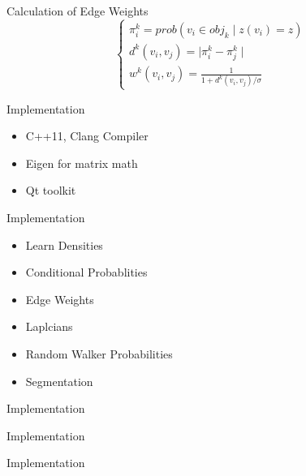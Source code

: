 \documentclass[14pt]{beamer}
\begin{document}
\begin{frame}{Calculation of Edge Weights}
    \[
        \begin{cases}
        \pi_i^k = prob(v_i \in obj_k \mid z(v_i)=z) \\
        d^k(v_{i}, v_{j}) = \mid \pi_i^k - \pi_j^k \mid \\
        w^{k}(v_{i}, v_{j}) = \frac{1}{1+d^{k}(v_{i}, v_{j})/\sigma}
    \end{cases}
    \]
\end{frame}

\begin{frame}{Implementation}
    \begin{itemize}
        \item C++11, Clang Compiler
        \item Eigen for matrix math
        \item Qt toolkit
    \end{itemize}
\end{frame}
\begin{frame}{Implementation}
    \begin{itemize}
        \item Learn Densities
        \item Conditional Probablities
        \item Edge Weights
        \item Laplcians
        \item Random Walker Probabilities
        \item Segmentation
    \end{itemize}
\end{frame}
\begin{frame}{Implementation}
    \lstfnw
\end{frame}
\begin{frame}{Implementation}
    \lstfnlij
\end{frame}
\begin{frame}{Implementation}
    \lstmtx
\end{frame}
\end{document}

